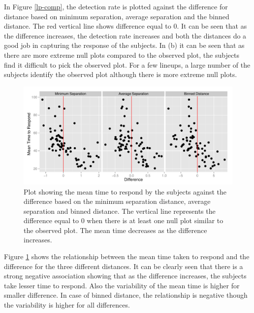 \documentclass[12]{article}
\begin{document}
In Figure \ref{lp-comp}, the detection rate is plotted against the difference for distance based on minimum separation, average separation and the binned distance. The red vertical line shows difference equal to 0.  It can be seen that as the difference increases, the detection rate increases and both the distances do a good job in capturing the response of the subjects.  In (b) it can be seen that as there are more extreme null plots compared to the observed plot, the subjects find it difficult to pick the observed plot. For a few lineups, a large number of the subjects identify the observed plot although there is more extreme null plots. 

\begin{figure}[hbtp]
\centering
\includegraphics[scale=0.75]{largep-mtime-sep-bin.pdf}
	\vspace{-.1in}
\caption[Optional caption for list of figures]{Plot showing the mean time to respond by the subjects against the difference based on the minimum separation distance, average separation and binned distance. The vertical line represents the difference equal to 0 when there is at least one null plot similar to the observed plot. The mean time decreases as the difference increases.  }
\label{lp-mtime}
\end{figure}

Figure \ref{lp-mtime} shows the relationship between the mean time taken to respond and the difference for the three different distances. It can be clearly seen that there is a strong negative association showing that as the difference increases, the subjects take lesser time to respond. Also the variability of the mean time is higher for smaller difference. In case of binned distance, the relationship is negative though the variability is higher for all differences.
\end{document}
